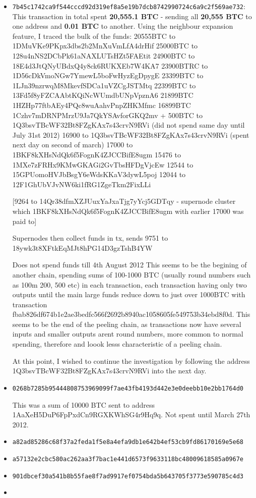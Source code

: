 \begin{itemize}
\item \texttt{7b45c1742ca9f544cccd92d319ef8a5e19b7dcb8742990724c6a9c2f569ae732}: This transaction in total spent \textbf{20,555.1 BTC} - sending all \textbf{20,555 BTC} to one address and \textbf{0.01 BTC} to another. Using the neighbour expansion feature, I traced the bulk of the funds: 
20555BTC to 1DMuVKe9PKpx3dbs2b2MnXuVmLfA4drHif
25000BTC to 128u4nNS2DCbPk61aNAXLUTsHZt5FAEtit
24900BTC to 18E4d3JtQNyUBdxQ4y8ck6RUKXEb7W4KA7
23900BTRC to 1D56cDkVmoNGw7YmewL5boFwHyzEgDpygE
23399BTC to 1LJn39nzrwqM8MkevfSDCa1uVZCgJSTMtq
22399BTC to 13Fd5f8yFZCAAbtKQiNcWUmdbUNpVpznA6
21899BTC 1HZHp77ftbAEy4PQc8wuAahvPnpZHKMfmc
16899BTC 1Czhv7mDRNPMrzU9Ja7QkYSAvforGKQ2mv + 500BTC to 1Q3bsvTBcWF32Bt8FZgKAx7s43crvN9RVi (did not spend same day until July 31st 2012)
16900 to 1Q3bsvTBcWF32Bt8FZgKAx7s43crvN9RVi (spent next day on second of march)
17000 to 1BKF8kXHsNdQk6f5FognK4ZJCCBifE8ugm
15476 to 1MXe7zFRHx9KMwGKAGi2GvTbsHFDgVjcEw
12544 to 15GPUomoHVJbBsgY6eWdsKKaV3dywL5poj
12044 to 12F1GhUbVJvNW6ki1fRG1ZgeTkm2FixLLi


[9264 to 14Qr38dfmXZJUuxYaJxaTjg7yYcj5GDTqy - supernode cluster which 1BKF8kXHsNdQk6f5FognK4ZJCCBifE8ugm with earlier 17000 was paid to]

Supernodes then collect funds in tx, sends 9751 to 18ywk3t8XFtkEqMJt8hPG14D3gzTshB4YW

Does not spend funds till 4th August 2012
This seems to be the begining of another chain, spending sums of 100-1000 BTC (usually round numbers such as 100m 200, 500 etc) in each transaction, each transaction having only two outputs until the main large funds reduce down to just over 1000BTC with transaction fbab826df674b1e2ae3bedfc566f2692b8940ac1058605fe549753b34ebd8f0d. This seems to be the end of the peeling chain, as transactions now have several inputs and smaller outputs arent round numbers, more common to normal spending, therefore and loook lesss characteristic of a peeling chain. 


At this point, I wished to continue the investigation by following the address 1Q3bsvTBcWF32Bt8FZgKAx7s43crvN9RVi into the next day. 

\item \texttt{0268b7285b95444808753969099f7ae43fb4193d442e3e0deebb10e2bb1764d0}


This was a sum of 10000 BTC sent to address 1AaXeH5DuP6FpPxdCn9RGXKWhSG4r9Hq9q. Not spent until March 27th 2012.


\item \texttt{a82ad85286c68f37a2feda1f5e8a4efa9db1e642b4ef53cb9fd86170169e5e68}
\item \texttt{a57132e2cbc580ac262aa3f7bac1e441d6573f9633118bc48009618585a0967e}
\item \texttt{901dbcef30a541b8b55fae8f7ad9917ef0754bda5b643705f3773e590785c4d3}
\item 

\end{itemize}

